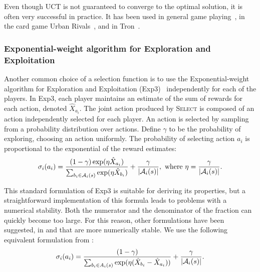 Even though UCT is not guaranteed to converge to the optimal solution, it is often very successful in practice.
It has been used in general game playing~\cite{Finnsson12}, in the card game Urban Rivals~\cite{Teytaud11Upper},
and in Tron~\cite{Perick12Comparison}.


\subsubsection{Exponential-weight algorithm for Exploration and Exploitation}\label{sec:exp3}

Another common choice of a selection function is to use the Exponential-weight algorithm for Exploration and Exploitation (Exp3)~\cite{Auer2003Exp3} independently for each of the players.
In Exp3, each player maintains an estimate of the sum of rewards for each action, denoted $\hat{X}_{a_i}$.
The joint action produced by \textsc{Select} is composed of an action independently selected for each player.
An action is selected by sampling from a probability distribution over actions.
Define $\gamma$ to be the probability of exploring, \ie choosing an action uniformly.
The probability of selecting action $a_i$ is proportional to the exponential of the reward estimates:
\begin{equation}\label{eq:exp3select}
\sigma_i(a_i) = \frac{(1-\gamma) \exp(\eta \hat{X}_{a_i})}{\sum_{b_i \in \mathcal{A}_i(s)} \exp(\eta \hat{X}_{b_i})} + \frac{\gamma}{|\mathcal{A}_i(s)|},
  \mbox{ where } \eta = \frac{\gamma}{|\mathcal{A}_i(s)|}.
\end{equation}

This standard formulation of Exp3 is suitable for deriving its properties, but a straightforward implementation of this formula leads to problems with a numerical stability. Both the numerator and the denominator of the fraction can quickly become too large. For this reason, other formulations have been suggested, \eg in \cite{Lanctot13Goofspiel} and \cite{Cowling12ISMCTS} that are more numerically stable. We use the following equivalent formulation from \cite{Cowling12ISMCTS}:
\begin{equation} \label{eq:exp3:stable}
\sigma_i(a_i) = \frac{(1-\gamma)}{\sum_{b_i \in A_i(s)}\exp(\eta(\hat{X}_{b_i}-\hat{X}_{a_i}))} + \frac{\gamma}{|\mathcal{A}_i(s)|}.
\end{equation}

